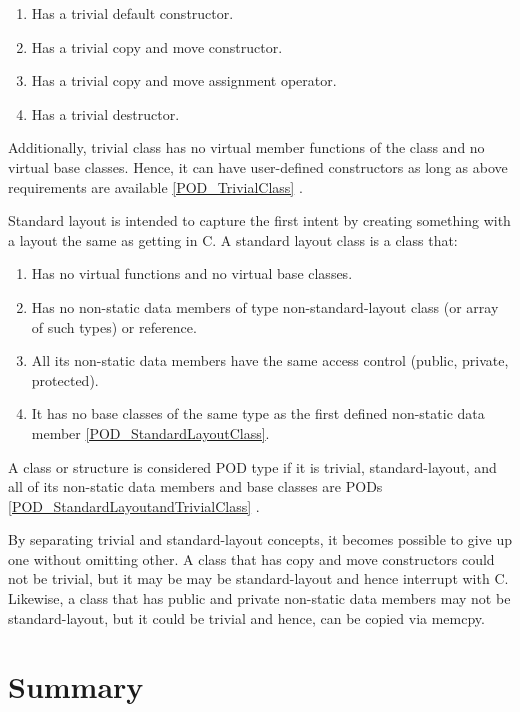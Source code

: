 \documentclass[11pt]{report}
\begin{document}
\begin{enumerate}
\item	Has a trivial default constructor. 
\item	Has a trivial copy and move constructor.
\item	Has a trivial copy and move assignment operator.
\item	Has a trivial destructor.
\end{enumerate}

Additionally, trivial class has no virtual member functions of the class and no virtual base classes. Hence, it can have user-defined constructors as long as above requirements are available \ref{POD_TrivialClass} \cite{ISO:2011:Cpplanguage}.

Standard layout is intended to capture the first intent by creating something with a layout the same as getting in C. A standard layout class is a class that:

\begin{enumerate}
\item	Has no virtual functions and no virtual base classes.
\item	Has no non-static data members of type non-standard-layout class (or array of such types) or reference.
\item	All its non-static data members have the same access control (public, private, protected).
\item	It has no base classes of the same type as the first defined non-static data member \ref{POD_StandardLayoutClass}.
\end{enumerate}

A class or structure is considered POD type if it is trivial, standard-layout, and all of its non-static data members and base classes are PODs \ref{POD_StandardLayoutandTrivialClass} \cite {ISO:2011:Cpplanguage}.


By separating trivial and standard-layout concepts, it becomes possible to give up one without omitting other. A class that has copy  and move constructors could not be trivial, but it may be may be standard-layout and hence interrupt with C. Likewise, a class that has  public and private non-static data members may not be standard-layout, but it could be trivial and hence, can be copied via memcpy.


\section{Summary}
\label{sec: Summary}
\end{document}
